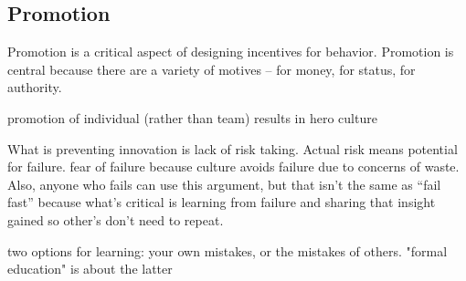 \subsection{Promotion}

Promotion is a critical aspect of designing incentives for behavior. Promotion is central because there are a variety of motives -- for money, for status, for authority. 

promotion of individual (rather than team) results in hero culture

What is preventing innovation is lack of risk taking. Actual risk means potential for failure. fear of failure because culture avoids failure due to concerns of waste. Also, anyone who fails can use this argument, but that isn't the same as ``fail fast'' because what's critical is learning from failure and sharing that insight gained so other's don't need to repeat. 

two options for learning: your own mistakes, or the mistakes of others. "formal education" is about the latter
